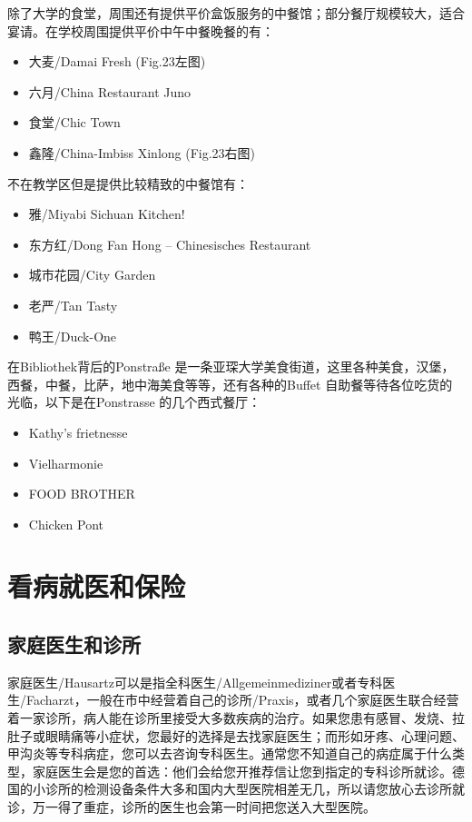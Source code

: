     除了大学的食堂，周围还有提供平价盒饭服务的中餐馆；部分餐厅规模较大，适合宴请。在学校周围提供平价中午中餐晚餐的有：

    \begin{itemize}
      \item 大麦/Damai Fresh (Fig.23左图)
      \item 六月/China Restaurant Juno
      \item 食堂/Chic Town
      \item 鑫隆/China-Imbiss Xinlong (Fig.23右图)
    \end{itemize}

    不在教学区但是提供比较精致的中餐馆有：

    \begin{itemize}
      \item 雅/Miyabi Sichuan Kitchen! 
      \item 东方红/Dong Fan Hong – Chinesisches Restaurant
      \item 城市花园/City Garden
      \item 老严/Tan Tasty
      \item 鸭王/Duck-One
    \end{itemize}

    在Bibliothek背后的Ponstraße 是一条亚琛大学美食街道，这里各种美食，汉堡，西餐，中餐，比萨，地中海美食等等，还有各种的Buffet 自助餐等待各位吃货的光临，以下是在Ponstrasse 的几个西式餐厅：

    \begin{itemize}
      \item Kathy’s frietnesse
      \item Vielharmonie 
      \item FOOD BROTHER
      \item Chicken Pont
    \end{itemize}

\section{看病就医和保险}

  \subsection{家庭医生和诊所}

    家庭医生/Hausartz可以是指全科医生/Allgemeinmediziner或者专科医生/Facharzt，一般在市中经营着自己的诊所/Praxis，或者几个家庭医生联合经营着一家诊所，病人能在诊所里接受大多数疾病的治疗。如果您患有感冒、发烧、拉肚子或眼睛痛等小症状，您最好的选择是去找家庭医生；而形如牙疼、心理问题、甲沟炎等专科病症，您可以去咨询专科医生。通常您不知道自己的病症属于什么类型，家庭医生会是您的首选：他们会给您开推荐信让您到指定的专科诊所就诊。德国的小诊所的检测设备条件大多和国内大型医院相差无几，所以请您放心去诊所就诊，万一得了重症，诊所的医生也会第一时间把您送入大型医院。

